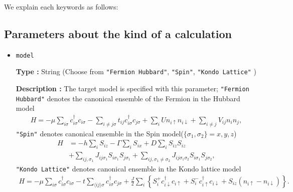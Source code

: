 We explain each keywords as follows:

\subsection{Parameters about the kind of a calculation}

\begin{itemize}

\item \verb|model|

  {\bf Type :} String (Choose from \verb|"Fermion Hubbard"|, \verb|"Spin"|, \verb|"Kondo Lattice"|
  )

{\bf Description :} The target model is specified with this parameter;
\verb|"Fermion Hubbard"| denotes
the canonical ensemble of the Fermion in the Hubbard model
\begin{align}
H = -\mu \sum_{i \sigma} c^\dagger_{i \sigma} c_{i \sigma} 
- \sum_{i \neq j \sigma} t_{i j} c^\dagger_{i \sigma} c_{j \sigma} 
+ \sum_{i} U n_{i \uparrow} n_{i \downarrow}
+ \sum_{i \neq j} V_{i j} n_{i} n_{j},
\label{fml4_1_hubbard}
\end{align}
\verb|"Spin"| denotes canonical ensemble
in the Spin model($\{\sigma_1, \sigma_2\}={x, y, z}$)
\begin{align}
H &= -h \sum_{i} S_{i z} - \Gamma \sum_{i} S_{i x} + D \sum_{i} S_{i z} S_{i z}
\nonumber \\
&+ \sum_{i j, \sigma_1}J_{i j \sigma_1} S_{i \sigma_1} S_{j \sigma_1}+ \sum_{i j, \sigma_1 \neq \sigma_2} J_{i j \sigma_1 \sigma_2} S_{i \sigma_1} S_{j \sigma_2} ,
\label{fml4_1_spin}
\end{align}
\verb|"Kondo Lattice"| denotes canonical ensemble in the Kondo lattice model
\begin{align}
H = - \mu \sum_{i \sigma} c^\dagger_{i \sigma} c_{i \sigma} 
- t \sum_{\langle i j \rangle \sigma} c^\dagger_{i \sigma} c_{j \sigma} 
+ \frac{J}{2} \sum_{i} \left\{
S_{i}^{+} c_{i \downarrow}^\dagger c_{i \uparrow}
+ S_{i}^{-} c_{i \uparrow}^\dagger c_{i \downarrow}
+ S_{i z} (n_{i \uparrow} - n_{i \downarrow})
\right\}.
\label{fml4_1_kondo}
\end{align}


\end{itemize}
